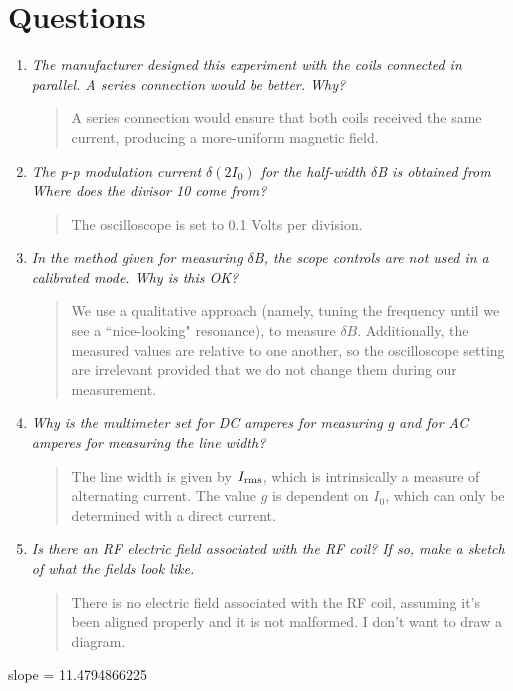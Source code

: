 \documentclass{amsart}
\begin{document}
\section{Questions}
\begin{enumerate}
    \item {\textit{The manufacturer designed this experiment with the coils connected in parallel. A series connection would be better. Why?}
    \begin{quote}
        A series connection would ensure that both coils received the same current, producing a more-uniform magnetic field.
    \end{quote}}
    \item {\textit{The p-p modulation current $\delta(2I_0)$ for the half-width $\delta$B is obtained from Where does the divisor 10 come from?}
    \begin{quote}
        The oscilloscope is set to 0.1 Volts per division.
    \end{quote}}
    \item {\textit{In the method given for measuring $\delta$B, the scope controls are not used in a calibrated mode. Why is this OK?}
    \begin{quote}
        We use a qualitative approach (namely, tuning the frequency until we see a ``nice-looking" resonance), to measure $\delta B$. Additionally, the measured values are relative to one another, so the oscilloscope setting are irrelevant provided that we do not change them during our measurement.
    \end{quote}}
    \item {\textit{Why is the multimeter set for DC amperes for measuring g and for AC amperes for measuring the line width?}
    \begin{quote}
        The line width is given by $I_{\rm rms}$, which is intrinsically a measure of alternating current. The value $g$ is dependent on $I_0$, which can only be determined with a direct current.
    \end{quote}}
    \item {\textit{Is there an RF electric field associated with the RF coil? If so, make a sketch of what the fields look like.}
    \begin{quote}
        There is no electric field associated with the RF coil, assuming it's been aligned properly and it is not malformed. I don't want to draw a diagram.
    \end{quote}}
\end{enumerate}



slope = 11.4794866225
\end{document}
